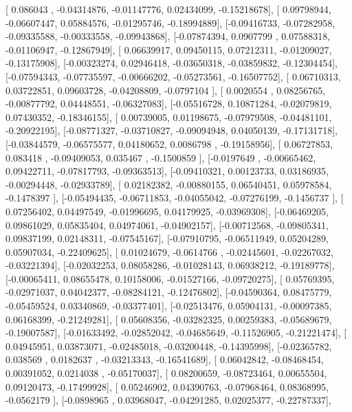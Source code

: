 \documentclass{article}
\begin{document}
       [ 0.086043  , -0.04314876, -0.01147776,  0.02434099, -0.15218678],
       [ 0.09798944, -0.06607447,  0.05884576, -0.01295746, -0.18994889],
       [-0.09416733, -0.07282958, -0.09335588, -0.00333558, -0.09943868],
       [-0.07874394,  0.0907799 ,  0.07588318, -0.01106947, -0.12867949],
       [ 0.06639917,  0.09450115,  0.07212311, -0.01209027, -0.13175908],
       [-0.00323274,  0.02946418, -0.03650318, -0.03859832, -0.12304454],
       [-0.07594343, -0.07735597, -0.00666202, -0.05273561, -0.16507752],
       [ 0.06710313,  0.03722851,  0.09603728, -0.04208809, -0.0797104 ],
       [ 0.0020554 ,  0.08256765, -0.00877792,  0.04448551, -0.06327083],
       [-0.05516728,  0.10871284, -0.02079819,  0.07430352, -0.18346155],
       [ 0.00739005,  0.01198675, -0.07979508, -0.04481101, -0.20922195],
       [-0.08771327, -0.03710827, -0.09094948,  0.04050139, -0.17131718],
       [-0.03844579, -0.06575577,  0.04180652,  0.0086798 , -0.19158956],
       [ 0.06727853,  0.083418  , -0.09409053,  0.035467  , -0.1500859 ],
       [-0.0197649 , -0.00665462,  0.09422711, -0.07817793, -0.09363513],
       [-0.09410321,  0.00123733,  0.03186935, -0.00294448, -0.02933789],
       [ 0.02182382, -0.00880155,  0.06540451,  0.05978584, -0.1478397 ],
       [-0.05494435, -0.06711853, -0.04055042, -0.07276199, -0.1456737 ],
       [ 0.07256402,  0.04497549, -0.01996695,  0.04179925, -0.03969308],
       [-0.06469205,  0.09861029,  0.05835404,  0.04974061, -0.04902157],
       [-0.00712568, -0.09805341,  0.09837199,  0.02148311, -0.07545167],
       [-0.07910795, -0.06511949,  0.05204289,  0.05907034, -0.22409625],
       [ 0.01024679, -0.0614766 , -0.02445601, -0.02267032, -0.03221394],
       [-0.02032253,  0.08058286, -0.01028143,  0.06938212, -0.19189778],
       [-0.00065411,  0.08655478,  0.10158006, -0.01527166, -0.09720275],
       [ 0.05769395, -0.02971037,  0.04042377, -0.08284121, -0.12476802],
       [-0.04590364,  0.08475779, -0.05459524,  0.03340869, -0.03377401],
       [-0.02513476,  0.05904131, -0.00097385,  0.06168399, -0.21249281],
       [ 0.05608356, -0.03282325,  0.00259383, -0.05689679, -0.19007587],
       [-0.01633492, -0.02852042, -0.04685649, -0.11526905, -0.21221474],
       [ 0.04945951,  0.03873071, -0.02485018, -0.03200448, -0.14395998],
       [-0.02365782,  0.038569  ,  0.0182637 , -0.03213343, -0.16541689],
       [ 0.06042842, -0.08468454,  0.00391052,  0.0214038 , -0.05170037],
       [ 0.08200659, -0.08723464,  0.00655504,  0.09120473, -0.17499928],
       [ 0.05246902,  0.04390763, -0.07968464,  0.08368995, -0.0562179 ],
       [-0.0898965 ,  0.03968047, -0.04291285,  0.02025377, -0.22787337],
\end{document}
